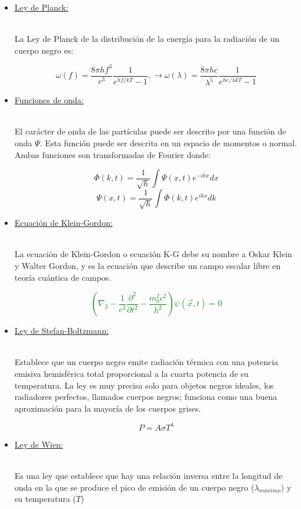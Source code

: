 \documentclass[letterpaper,12pt]{article}
\begin{document}
\begin{itemize}
    \item[\bigstar]\large{\underline{Ley de Planck:}}\\\\
    \small{La Ley de Planck de la distribución de la energía para la radiación de un cuerpo negro es:
    
    $$\omega (f)=\frac{8\pi hf^3}{c^3}\frac{1}{e^{hf/kT}-1}, \to \omega (\lambda)=\frac{8\pi hc}{\lambda^5}\frac{1}{e^{he/\lambda kT}-1}$$
    
    }
    
    \item[\bigstar]\large{\underline{Funciones de onda:}}\\\\
    \small{El carácter de onda de las partículas puede ser descrito por una función de onda $\Psi$. Esta función puede ser descrita en un espacio de momentos o normal. Ambas funciones son transformadas de Fourier donde: 
    
    $$\varPhi (k,t)=\frac{1}{\sqrt{h}}\int\Psi(x,t)e^{-ikx}dx$$  $$\Psi(x,t)=\frac{1}{\sqrt{h}}\int\varPhi(k,t)e^{ikx}dk$$
   
    }
    
    \item[\bigstar]\large{\underline{Ecuación de Klein-Gordon:}}\\\\
    \small{La ecuación de Klein-Gordon o ecuación K-G debe su nombre a Oskar Klein y Walter Gordon, y es la ecuación que describe un campo escalar libre en teoría cuántica de campos.


    \textcolor{green}{$$(\nabla_2-\frac{1}{c^2}\frac{\partial^2}{\partial t^2}-\frac{m_0^2c^2}{h^2})\psi(\vec{x},t)=0$$  }
   
    }
    
    \item[\bigstar]\large{\underline{Ley de Stefan-Boltzmann:}}\\\\
    \small{Establece que un cuerpo negro emite radiación térmica con una potencia emisiva hemisférica total proporcional a la cuarta potencia de su temperatura. La ley es muy precisa solo para objetos negros ideales, los radiadores perfectos, llamados cuerpos negros; funciona como una buena aproximación para la mayoría de los cuerpos grises.


    $$P=A\sigma T^4$$  
   
    }
    
    \item[\bigstar]\large{\underline{Ley de Wien:}}\\\\
    \small{Es una ley que establece que hay una relación inversa entre la longitud de onda en la que se produce el pico de emisión de un cuerpo negro ($\lambda_{maximo}$) y su temperatura ($T$)


}
\end{itemize}
\end{document}
